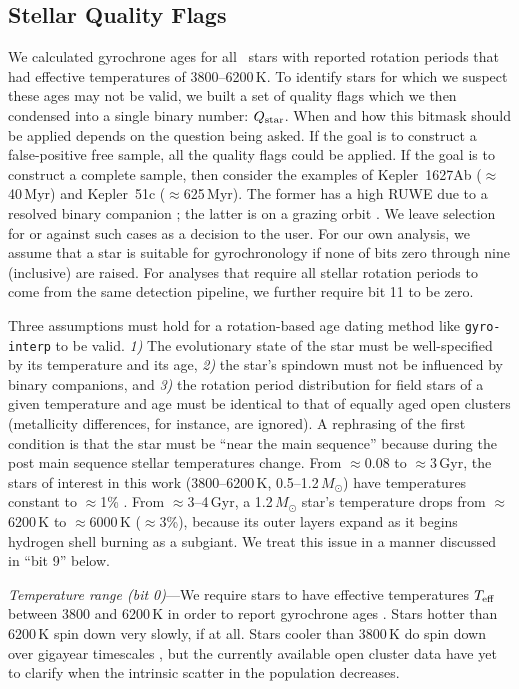 \documentclass[11pt,twocolumn,tighten]{aastex63}
\begin{document}
\subsection{Stellar Quality Flags}
\label{subsec:flags}
We calculated gyrochrone ages for all \nuniqstarsantosrotteffcut\
stars with reported rotation periods that had effective temperatures of
3800--6200\,K.  To identify stars for which we suspect these ages may not
be valid, we built a set of quality flags which we then condensed
into a single binary number: $Q_{\rm star}$.  When and how
this bitmask should be applied depends on the question being
asked.  If the goal is to construct a false-positive free sample, all the
quality flags could be applied.  If the goal is to construct a complete sample,
then consider the examples of Kepler~1627Ab ($\approx$40\,Myr) and
Kepler~51c ($\approx$625\,Myr).  The former has a high RUWE due to a
resolved binary companion \citep{Bouma_2022a}; the latter is on a
grazing orbit \citep{2014ApJ...783...53M}.  We leave selection for or
against such cases as a decision to the user.
For our own analysis, 
we assume that a star
is suitable for gyrochronology if none of bits zero through nine
(inclusive) are raised.  For analyses that require all
stellar rotation periods to come from the same detection pipeline, we
further require bit 11 to be zero. 

Three assumptions must hold for a rotation-based age dating method
like \texttt{gyro-interp} to be valid.  {\it 1)} The evolutionary
state of the star must be well-specified by its temperature and its
age, {\it 2)} the star's spindown must not be influenced by binary
companions, and {\it 3)} the rotation period distribution for field
stars of a given temperature and age must be identical to that of
equally aged open clusters (metallicity differences, for instance, are
ignored).  A rephrasing of the first condition is that the star must
be ``near the main sequence'' because during the post main sequence
stellar temperatures change.  From $\approx$0.08 to $\approx$3\,Gyr,
the stars of interest in this work (3800--6200\,K,
0.5--1.2\,$M_\odot$) have temperatures constant to $\approx$1\%
\citep{Choi_2016}.  From $\approx$3--4\,Gyr, a 1.2\,$M_\odot$ star's
temperature drops from $\approx$6200\,K to $\approx$6000\,K
($\approx$3\%), because its outer layers expand as it begins hydrogen
shell burning as a subgiant.  We treat this issue in a manner
discussed in ``bit 9'' below.

{\it Temperature range (bit 0)}---We require stars to have effective
temperatures $T_{\rm eff}$ between 3800 and 6200\,K in order to report
gyrochrone ages \citep{Bouma_2023}.   Stars hotter than 6200\,K spin
down very slowly, if at all.  Stars cooler than 3800\,K do spin down
over gigayear timescales
\citep{2016ApJ...821...93N,2023ApJ...954L..50E,2024arXiv240312129C},
but the currently available open cluster data have yet to clarify
when the intrinsic scatter in the population decreases.
\end{document}
